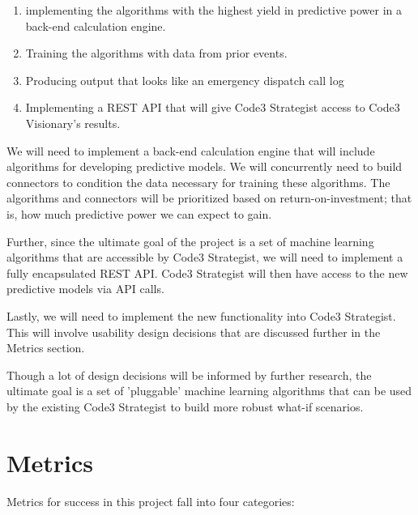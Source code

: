 \documentclass[onecolumn, draftclsnofoot,10pt, compsoc]{IEEEtran}
\begin{document}
\begin{enumerate}
    \item implementing the algorithms with the highest yield in predictive power in a back-end calculation engine. 
    \item Training the algorithms with data from prior events.
    \item Producing output that looks like an emergency dispatch call log
    \item Implementing a REST API that will give Code3 Strategist access to Code3 Visionary's results.
\end{enumerate}

We will need to implement a back-end calculation engine that will include algorithms for developing predictive models.
We will concurrently need to build connectors to condition the data necessary for training these algorithms.
The algorithms and connectors will be prioritized based on return-on-investment; that is, how much predictive power we can expect to gain. \par

Further, since the ultimate goal of the project is a set of machine learning algorithms that are accessible by Code3 Strategist, we will need to implement a fully encapsulated REST API.
Code3 Strategist will then have access to the new predictive models via API calls. \par

Lastly, we will need to implement the new functionality into Code3 Strategist.
This will involve usability design decisions that are discussed further in the Metrics section. \par

Though a lot of design decisions will be informed by further research, the ultimate goal is a set of 'pluggable' machine learning algorithms that can be used by the existing Code3 Strategist to build more robust what-if scenarios.

\section{Metrics}
Metrics for success in this project fall into four categories:
\end{document}
